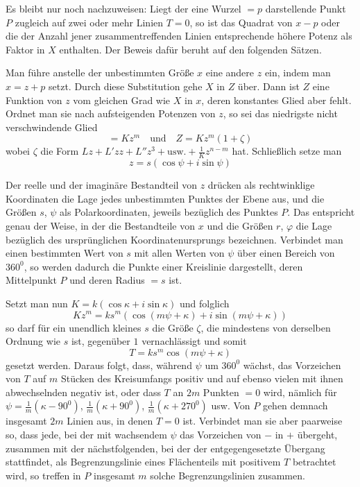 
Es bleibt nur noch nachzuweisen: Liegt der eine Wurzel $=p$ darstellende Punkt $P$ zugleich auf zwei oder mehr Linien $T=0$, so ist das Quadrat von $x-p$ oder die der Anzahl jener zusammentreffenden Linien entsprechende höhere Potenz als Faktor in $X$ enthalten. Der Beweis dafür beruht auf den folgenden Sätzen.

Man führe anstelle der unbestimmten Größe $x$ eine andere $z$ ein, indem man $x=z+p$ setzt. Durch diese Substitution gehe $X$ in $Z$ über. Dann ist $Z$ eine Funktion von $z$ vom gleichen Grad wie $X$ in $x$, deren konstantes Glied aber fehlt. Ordnet man sie nach aufsteigenden Potenzen von $z$, so sei das niedrigste nicht verschwindende Glied
\[
=Kz^m\quad\mbox{und}\quad Z=Kz^m(1+\zeta)
\]
wobei $\zeta$ die Form $Lz+L'zz+L''z^3+\mbox{usw.}+\frac{1}{K}z^{n-m}$ hat. Schließlich setze man
\[
z=s(\cos\psi+i\sin\psi)
\]

Der reelle und der imaginäre Bestandteil von $z$ drücken als rechtwinklige Koordinaten die Lage jedes unbestimmten Punktes der Ebene aus, und die Größen $s$, $\psi$ als Polarkoordinaten, jeweils bezüglich des Punktes $P$. Das entspricht genau der Weise, in der die Bestandteile von $x$ und die Größen $r$, $\varphi$ die Lage bezüglich des ursprünglichen Koordinatenursprungs bezeichnen. Verbindet man einen bestimmten Wert von $s$ mit allen Werten von $\psi$ über einen Bereich von $360^0$, so werden dadurch die Punkte einer Kreislinie dargestellt, deren Mittelpunkt $P$ und deren Radius $=s$ ist.

Setzt man nun $K=k(\cos\kappa+i\sin\kappa)$ und folglich
\[
Kz^m=ks^m(\cos(m\psi+\kappa)+i\sin(m\psi+\kappa))
\]
so darf für ein unendlich kleines $s$ die Größe $\zeta$, die mindestens von derselben Ordnung wie $s$ ist, gegenüber $1$ vernachlässigt und somit
\[
T=ks^m\cos(m\psi+\kappa)
\]
gesetzt werden. Daraus folgt, dass, während $\psi$ um $360^0$ wächst, das Vorzeichen von $T$ auf $m$ Stücken des Kreisumfangs positiv und auf ebenso vielen mit ihnen abwechselnden negativ ist, oder dass $T$ an $2m$ Punkten $=0$ wird, nämlich für $\psi=\frac{1}{m}(\kappa-90^0)$, $\frac{1}{m}(\kappa+90^0)$, $\frac{1}{m}(\kappa+270^0)$ usw. Von $P$ gehen demnach insgesamt $2m$ Linien aus, in denen $T=0$ ist. Verbindet man sie aber paarweise so, dass jede, bei der mit wachsendem $\psi$ das Vorzeichen von $-$ in $+$ übergeht, zusammen mit der nächstfolgenden, bei der der entgegengesetzte Übergang stattfindet, als Begrenzungslinie eines Flächenteils mit positivem $T$ betrachtet wird, so treffen in $P$ insgesamt $m$ solche Begrenzungslinien zusammen.

